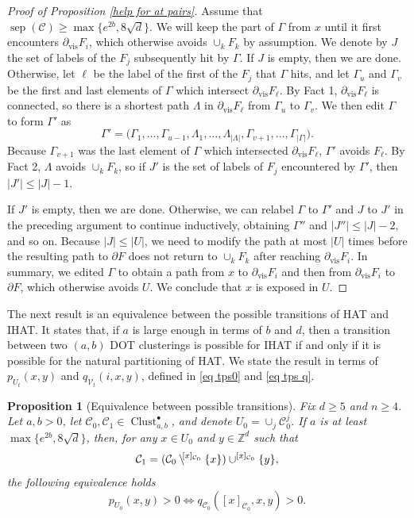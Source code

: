 \documentclass[11pt,reqno]{amsart}
\newtheorem{proposition}[lemma]{Proposition}
\theoremstyle{definition}
\numberwithin{equation}{section}
\newcommand{\Z}{\mathbb{Z}}
\newcommand{\1}{\mathbf{1}}
\newcommand{\bdy}{\partial}
\newcommand{\bdyvis}{\partial_{\mathrm{vis}}}
\DeclareMathOperator{\sep}{sep}
\newcommand{\sd}[1]{\setminus^{\hspace{-0.2em} #1}}
\newcommand{\CC}{\mathcal{C}}
\newcommand{\VV}{\mathcal{V}}
\DeclareMathOperator{\Clust}{\mathrm{Clust}}
\begin{document}
\begin{proof}[Proof of Proposition \ref{help for at pairs}]
Assume that $\sep (\CC) \geq \max\{e^{2b},8\sqrt{d}\}$. We will keep the part of $\Gamma$ from $x$ until it first encounters $\bdyvis F_i$, which otherwise avoids $\cup_k F_k$ by assumption. We denote by $J$ the set of labels of the $F_j$ subsequently hit by $\Gamma$. If $J$ is empty, then we are done. Otherwise, let $\ell$ be the label of the first of the $F_j$ that $\Gamma$ hits, and let $\Gamma_u$ and $\Gamma_v$ be the first and last elements of $\Gamma$ which intersect $\bdyvis F_\ell$. By Fact 1, $\bdyvis F_\ell$ is connected, so there is a shortest path $\Lambda$ in $\bdyvis F_\ell$ from $\Gamma_u$ to $\Gamma_v$. We then edit $\Gamma$ to form $\Gamma'$ as
\[ \Gamma' = \big( \Gamma_1, \dots, \Gamma_{u-1}, \Lambda_1, \dots, \Lambda_{|\Lambda|}, \Gamma_{v+1}, \dots, \Gamma_{|\Gamma|} \big).\] 
Because $\Gamma_{v+1}$ was the last element of $\Gamma$ which intersected $\bdyvis F_\ell$, $\Gamma'$ avoids $F_\ell$. By Fact 2, $\Lambda$ avoids $\cup_k F_k$, so if $J'$ is the set of labels of $F_j$ encountered by $\Gamma'$, then $|J'| \leq |J|-1$.

If $J'$ is empty, then we are done. Otherwise, we can relabel $\Gamma$ to $\Gamma'$ and $J$ to $J'$ in the preceding argument to continue inductively, obtaining $\Gamma''$ and $|J''| \leq |J|-2$, and so on. Because $|J| \leq |U|$, we need to modify the path at most $|U|$ times before the resulting path to $\bdy F$ does not return to $\cup_k F_k$ after reaching $\bdyvis F_i$. In summary, we edited $\Gamma$ to obtain a path from $x$ to $\bdyvis F_i$ and then from $\bdyvis F_i$ to $\bdy F$, which otherwise avoids $U$. We conclude that $x$ is exposed in $U$.
\end{proof}


The next result is an equivalence between the possible transitions of HAT and IHAT. It states that, if $a$ is large enough in terms of $b$ and $d$, then a transition between two $(a,b)$ DOT clusterings is possible for IHAT if and only if it is possible for the natural partitioning of HAT. We state the result in terms of $p_{U_t} (x,y)$ and $q_{\VV_t} (i,x,y)$, defined in \eqref{eq tps0} and \eqref{eq tps q}.

\begin{proposition}[Equivalence between possible transitions]\label{at pairs}
Fix $d \geq 5$ and $n \geq 4$. Let $a,b > 0$, let $\CC_0, \CC_1 \in \Clust_{a,b}^\bullet$, and denote $U_0 = \cup_j \CC_0^j$. If $a$ is at least $\max\{e^{2b},8\sqrt{d}\}$,  
then, for any $x \in U_0$ and $y \in \Z^d$ such that 
\begin{equation}\label{c0 to c1 equiv}
\CC_1 = (\CC_0 \sd{[x]_{\CC_0}} \{x\}) \cup^{[x]_{\CC_0}} \{y\},
\end{equation}
the following equivalence holds
\begin{equation}\label{corresp}
p_{U_0} (x,y) > 0 \iff q_{\CC_0} ([x]_{\CC_0},x,y) > 0.
\end{equation}
\end{proposition}
\end{document}

